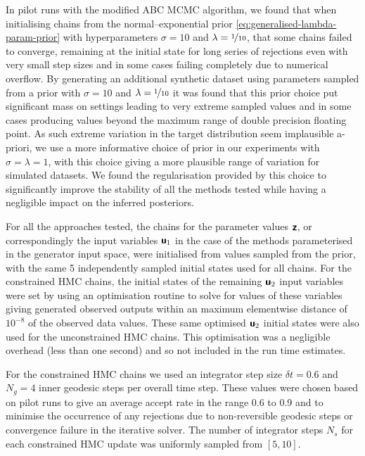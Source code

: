 In pilot runs with the modified \ac{ABC} \ac{MCMC} algorithm, we found that when initialising chains from the normal--exponential prior \eqref{eq:generalised-lambda-param-prior} with hyperparameters $\sigma = 10$ and $\lambda = \nicefrac{1}{10}$, that some chains failed to converge, remaining at the initial state for long series of rejections even with very small step sizes and in some cases failing completely due to numerical overflow. By generating an additional synthetic dataset using parameters sampled from a prior with  $\sigma = 10$ and $\lambda = \nicefrac{1}{10}$ it was found that this prior choice put significant mass on settings leading to very extreme sampled values and in some cases producing values beyond the maximum range of double precision floating point. As such extreme variation in the target distribution seem implausible a-priori, we use a more informative choice of prior in our experiments with $\sigma = \lambda = 1$, with this choice giving a more plausible range of variation for simulated datasets. We found the regularisation provided by this choice to significantly improve the stability of all the methods tested while having a negligible impact on the inferred posteriors.

For all the approaches tested, the chains for the parameter values $\boldsymbol{\mathsf{z}}$, or correspondingly the input variables $\boldsymbol{\mathsf{u}}_1$ in the case of the methods parameterised in the generator input space, were initialised from values sampled from the prior, with the same 5 independently sampled initial states used for all chains. For the constrained \ac{HMC} chains, the initial states of the remaining $\boldsymbol{\mathsf{u}}_2$ input variables were set by using an optimisation routine to solve for values of these variables giving generated observed outputs within an maximum elementwise distance of $10^{-8}$ of the observed data values. These same optimised $\boldsymbol{\mathsf{u}}_2$ initial states were also used for the unconstrained \ac{HMC} chains. This optimisation was a negligible overhead (less than one second) and so not included in the run time estimates.

For the constrained \ac{HMC} chains we used an integrator step size $\delta t = 0.6$ and $N_g = 4$ inner geodesic steps per overall time step. These values were chosen based on pilot runs to give an average accept rate in the range 0.6 to 0.9 \citep{betancourt2014optimizing} and to minimise the occurrence of any rejections due to non-reversible geodesic steps or convergence failure in the iterative solver. The number of integrator steps $N_s$ for each constrained \ac{HMC} update was uniformly sampled from $[5,10]$.

